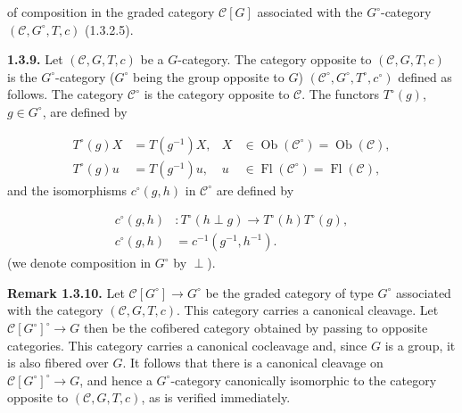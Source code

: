 %
of composition in the graded category $\mathcal C[G]$ associated with
the $G^\circ$-category $(\mathcal C,G^\circ,T,c)$ (1.3.2.5).

\noindent\textbf{1.3.9.}\quad
Let $(\mathcal C,G,T,c)$ be a $G$-category. The category opposite to
$(\mathcal C,G,T,c)$ is the $G^\circ$-category ($G^\circ$ being the
group opposite to $G$)
$(\mathcal C^\circ,G^\circ,T^\circ,c^\circ)$ defined as follows. The
category $\mathcal C^\circ$ is the category opposite to $\mathcal C$.
The functors $T^\circ(g)$, $g\in G^\circ$, are defined by

\begin{equation}
  \begin{aligned}
    T^\circ(g)X &= T(g^{-1})X,
      & X&\in\operatorname{Ob}(\mathcal C^\circ)
             =\operatorname{Ob}(\mathcal C),\\
    T^\circ(g)u &= T(g^{-1})u,
      & u&\in\operatorname{Fl}(\mathcal C^\circ)
             =\operatorname{Fl}(\mathcal C),
  \end{aligned}
  \tag{1.3.9.1}
\end{equation}
and the isomorphisms $c^\circ(g,h)$ in $\mathcal C^\circ$ are defined
by

\begin{equation}
  \begin{aligned}
    c^\circ(g,h)&\colon
      T^\circ(h\perp g)\longrightarrow T^\circ(h)T^\circ(g),\\
    c^\circ(g,h)&=c^{-1}(g^{-1},h^{-1}).
  \end{aligned}
  \tag{1.3.9.2}
\end{equation}
(we denote composition in $G^\circ$ by $\perp$).

\noindent\textbf{Remark 1.3.10.}\quad
Let $\mathcal C[G^\circ]\longrightarrow G^\circ$ be the graded category
of type $G^\circ$ associated with the category
$(\mathcal C,G,T,c)$. This category carries a canonical cleavage. Let
$\mathcal C[G^\circ]^\circ\longrightarrow G$ then be the cofibered
category obtained by passing to opposite categories. This category
carries a canonical cocleavage and, since $G$ is a group, it is also
fibered over $G$. It follows that there is a canonical cleavage on
$\mathcal C[G^\circ]^\circ\longrightarrow G$, and hence a
$G^\circ$-category canonically isomorphic to the category opposite to
$(\mathcal C,G,T,c)$, as is verified immediately.

